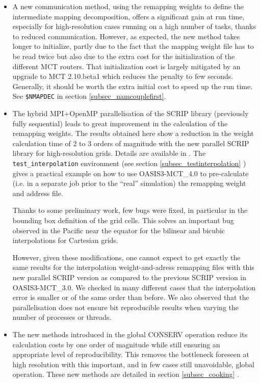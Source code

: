 \begin{itemize}

\item A new communication method, using the remapping weights to define the intermediate mapping decomposition, offers a significant gain at run time, especially for high-resolution cases running on a high number of tasks, thanks to reduced communication. However, as expected, the new method takes longer to initialize, partly due to the fact that the mapping weight file has to be read twice but also due to the extra cost for the initialization of the different MCT routers.  That initialization cost is largely mitigated by an upgrade to MCT 2.10.beta1 which reduces the penalty to few seconds.  Generally, it should be worth the extra initial cost to speed up the run time. See {\tt \$NMAPDEC} in section \ref{subsec_namcouplefirst}.

\item The hybrid MPI+OpenMP parallelisation of the SCRIP library (previously fully sequential) leads to great improvement in the calculation of the remapping weights. The results obtained here show a reduction in the weight calculation time of 2 to 3 orders of magnitude with the new parallel SCRIP library for high-resolution grids. Details are available in \cite{piacentini08}. The {\tt test\_interpolation} environment (see section \ref{subsec_testinterpolation} ) gives a practical example on how to use OASIS3-MCT\_4.0 to pre-calculate (i.e. in a separate job prior to the “real” simulation) the remapping weight and address file.

Thanks to some preliminary work, few bugs were fixed, in particular in the bounding box definition of the grid cells. This solves an important bug observed in the Pacific near the equator for the bilinear and bicubic interpolations for Cartesian grids.

However, given these modifications, one cannot expect to get exactly the same results for the interpolation weight-and-adress remapping files with this new parallel SCRIP version as compared to the previous SCRIP version in OASIS3-MCT\_3.0. We checked in many different cases that the interpolation error is smaller or of the same order than before. We also observed that the parallelisation does not ensure bit reproducible results when varying the number of processes or threads.

\item The new methods introduced in the global CONSERV operation reduce its calculation costs by one order of magnitude while still ensuring an appropriate level of reproducibility. This removes the bottleneck foreseen at high resolution with this important, and in few cases still unavoidable, global operation. These new methods are detailed in section \ref{subsec_cooking} .

\end{itemize}

